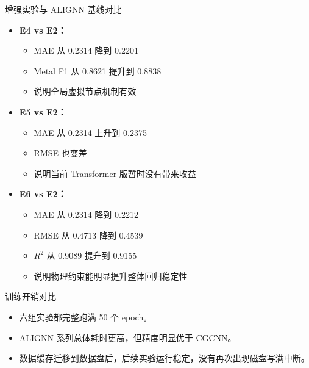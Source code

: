 \documentclass{beamer}
\begin{document}
\begin{frame}{增强实验与 ALIGNN 基线对比}
\small
\begin{itemize}
  \item \textbf{E4 vs E2：}
  \begin{itemize}
    \item MAE 从 0.2314 降到 0.2201
    \item Metal F1 从 0.8621 提升到 0.8838
    \item 说明全局虚拟节点机制有效
  \end{itemize}
  \item \textbf{E5 vs E2：}
  \begin{itemize}
    \item MAE 从 0.2314 上升到 0.2375
    \item RMSE 也变差
    \item 说明当前 Transformer 版暂时没有带来收益
  \end{itemize}
  \item \textbf{E6 vs E2：}
  \begin{itemize}
    \item MAE 从 0.2314 降到 0.2212
    \item RMSE 从 0.4713 降到 0.4539
    \item $R^2$ 从 0.9089 提升到 0.9155
    \item 说明物理约束能明显提升整体回归稳定性
  \end{itemize}
\end{itemize}
\end{frame}

\begin{frame}{训练开销对比}
\scriptsize
\centering
{}

\vspace{2mm}
\small
\begin{itemize}
  \item 六组实验都完整跑满 50 个 epoch。
  \item ALIGNN 系列总体耗时更高，但精度明显优于 CGCNN。
  \item 数据缓存迁移到数据盘后，后续实验运行稳定，没有再次出现磁盘写满中断。
\end{itemize}
\end{frame}
\end{document}
